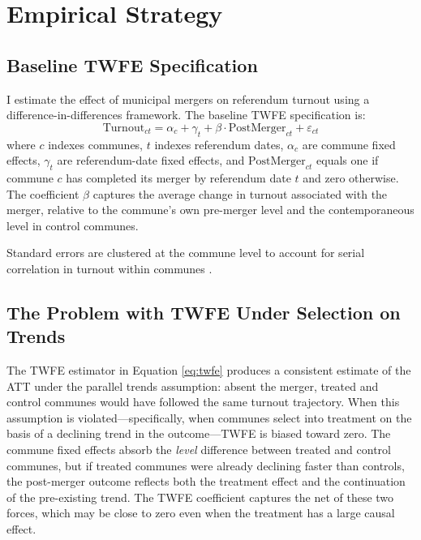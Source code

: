 \documentclass[12pt]{article}
\begin{document}
\section{Empirical Strategy}

\subsection{Baseline TWFE Specification}

I estimate the effect of municipal mergers on referendum turnout using a difference-in-differences framework. The baseline TWFE specification is:
\begin{equation}
\label{eq:twfe}
    \text{Turnout}_{ct} = \alpha_c + \gamma_t + \beta \cdot \text{PostMerger}_{ct} + \varepsilon_{ct}
\end{equation}
where $c$ indexes communes, $t$ indexes referendum dates, $\alpha_c$ are commune fixed effects, $\gamma_t$ are referendum-date fixed effects, and $\text{PostMerger}_{ct}$ equals one if commune $c$ has completed its merger by referendum date $t$ and zero otherwise. The coefficient $\beta$ captures the average change in turnout associated with the merger, relative to the commune's own pre-merger level and the contemporaneous level in control communes.

Standard errors are clustered at the commune level to account for serial correlation in turnout within communes \citep{cameron2008bootstrap}.

\subsection{The Problem with TWFE Under Selection on Trends}

The TWFE estimator in Equation \eqref{eq:twfe} produces a consistent estimate of the ATT under the parallel trends assumption: absent the merger, treated and control communes would have followed the same turnout trajectory. When this assumption is violated---specifically, when communes select into treatment on the basis of a declining trend in the outcome---TWFE is biased toward zero. The commune fixed effects absorb the \textit{level} difference between treated and control communes, but if treated communes were already declining faster than controls, the post-merger outcome reflects both the treatment effect and the continuation of the pre-existing trend. The TWFE coefficient captures the net of these two forces, which may be close to zero even when the treatment has a large causal effect.
\end{document}
